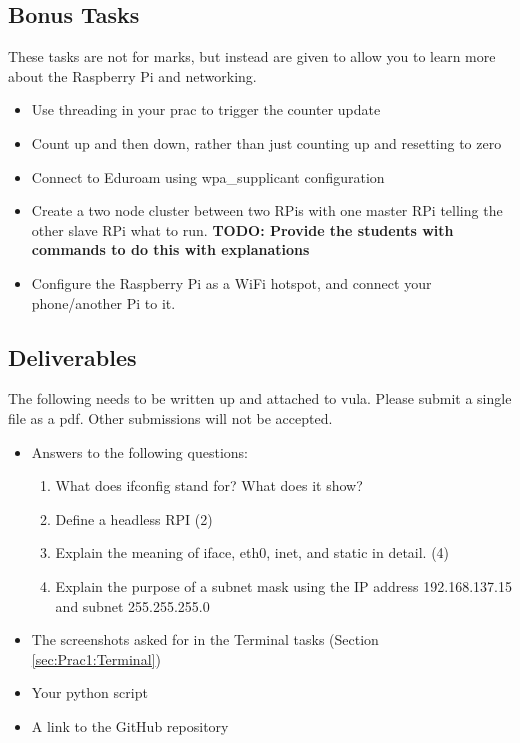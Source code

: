 \subsection{Bonus Tasks}
These tasks are not for marks, but instead are given to allow you to learn more about the Raspberry Pi and networking. 
\begin{itemize}
    \item Use threading in your prac to trigger the counter update
    \item Count up and then down, rather than just counting up and resetting to zero
    \item Connect to Eduroam using wpa\_supplicant configuration
    \item Create a two node cluster between two RPis with one master RPi telling the other slave RPi what to run. \textbf{TODO: Provide the students with commands to do this with explanations} 
    \item Configure the Raspberry Pi as a WiFi hotspot, and connect your phone/another Pi to it.
\end{itemize}

\subsection{Deliverables}
The following needs to be written up and attached to vula. Please submit a single file as a pdf. Other submissions will not be accepted.
\begin{itemize}
    \item Answers to the following questions:
        \begin{enumerate}
            \item What does ifconfig stand for? What does it show?
            \item Define a headless RPI (2)
            \item Explain the meaning of iface, eth0, inet, and static in detail. (4)
            \item Explain the purpose of a subnet mask using the IP address 192.168.137.15 and subnet 255.255.255.0
        \end{enumerate}
    \item The screenshots asked for in the Terminal tasks (Section \ref{sec:Prac1:Terminal})
    \item Your python script
    \item A link to the GitHub repository
\end{itemize}

